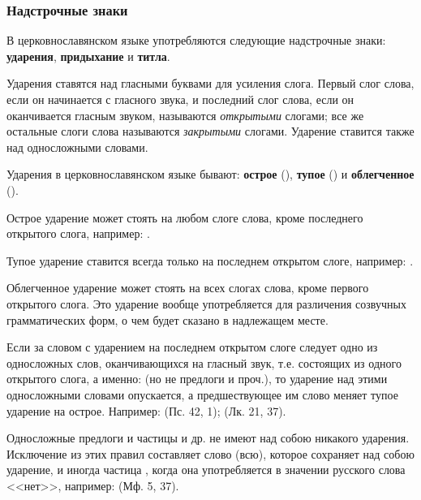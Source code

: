 \documentclass[11pt,a4paper,oneside]{memoir}
\newcommand{\mockitem}[1]{{\mock{#1}}}
\begin{document}
                \subsubsection{Надстрочные знаки}

    В церковнославянском языке употребляются следующие надстрочные знаки: \textbf{ударения}, \textbf{придыхание} и \textbf{титла}.

    \bigskip
    \mockitem{1. Ударения}
    \medskip

    Ударения ставятся над гласными буквами для усиления слога. Первый слог слова, если он начинается с гласного звука, и последний слог слова, если он оканчивается гласным звуком, называются \emph{открытыми} слогами; все же остальные слоги слова называются \emph{закрытыми} слогами. Ударение ставится также над односложными словами.
    
    Ударения в церковнославянском языке бывают: \textbf{острое} ({}), \textbf{тупое} ({}) и \textbf{облегченное} ({}).
    
    Острое ударение может стоять на любом слоге слова, кроме последнего открытого слога, например: {}.
    
    Тупое ударение ставится всегда только на последнем открытом слоге, например: {}.
    
    Облегченное ударение может стоять на всех слогах слова, кроме первого открытого слога. Это ударение вообще употребляется для различения созвучных грамматических форм, о чем будет сказано в надлежащем месте.
    
    Если за словом с ударением на последнем открытом слоге следует одно из односложных слов, оканчивающихся на гласный звук, т.е. состоящих из одного открытого слога, а именно: {} (но не предлоги {} и проч.), то ударение над этими односложными словами опускается, а предшествующее им слово меняет тупое ударение на острое. Например: {} (Пс. 42, 1); {} (Лк. 21, 37).
    
    Односложные предлоги и частицы {} и др. не имеют над собою никакого ударения. Исключение из этих правил составляет слово {} (всю), которое сохраняет над собою ударение, и иногда частица {}, когда она употребляется в значении русского слова <<нет>>, например: {} (Мф. 5, 37).
    
\end{document}
